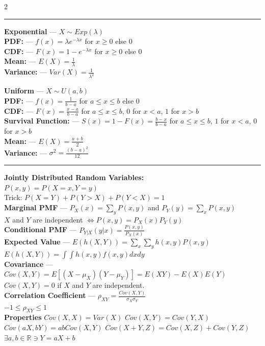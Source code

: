 \documentclass[10pt,letterpaper]{article}
\begin{document}
\begin{multicols}{2}
\vspace{0.1cm}
\hrule
\vspace{0.1cm}

\textbf{Exponential} --- $X \sim Exp(\lambda)$\\
\textbf{PDF:} --- $f(x) = \lambda e^{-\lambda x}$ for $ x \geq 0 $ else $0$\\
\textbf{CDF:} --- $F(x) = 1 - e^{-\lambda x}$ for $ x \geq 0 $ else $0$\\
\textbf{Mean:} --- $E(X) = \frac{1}{\lambda}$\\
\textbf{Variance:} --- $Var(X) = \frac{1}{\lambda^2}$

\vspace{1.5cm}

\textbf{Uniform} --- $X \sim U(a, b)$\\
\textbf{PDF:} --- $f(x) = \frac{1}{b - a}$ for $ a \leq x \leq b $ else $0$\\
\textbf{CDF:} --- $F(x) = \frac{x - a}{b - a}$ for $ a \leq x \leq b $, $0$ for $ x < a $, $1$ for $ x > b $\\
\textbf{Survival Function:} --- $S(x) = 1 - F(x) = \frac{b - x}{b - a}$ for $ a \leq x \leq b $, $1$ for $ x < a $, $0$ for $ x > b $\\
\textbf{Mean:} --- $E(X) = \frac{a + b}{2}$\\
\textbf{Variance:} --- $\sigma^2 = \frac{(b - a)^2}{12}$

\vspace{0.1cm}
\hrule
\vspace{0.1cm}

\textbf{Jointly Distributed Random Variables:}\\
$P(x, y) = P(X = x, Y = y)$\\
Trick: $P(X=Y) + P(Y > X) + P(Y < X) = 1$\\
\textbf{Marginal PMF} --- $P_X(x) = \sum_y P(x, y)$ and $P_Y(y) = \sum_x P(x, y)$\\
$X$ and $Y$ are independent $\iff P(x, y) = P_X(x)P_Y(y)$\\
\textbf{Conditional PMF} --- $P_{Y|X}(y|x) = \frac{P(x, y)}{P_X(x)}$\\
\textbf{Expected Value} --- $E(h(X,Y)) = \sum_x \sum_y h(x,y) P(x,y)$\\
$E(h(X,Y)) = \int \int h(x,y) f(x,y) dx dy$\\
\textbf{Covariance} --- $Cov(X,Y) = E[(X - \mu_X)(Y - \mu_Y)] = E(XY) - E(X)E(Y)$\\
$Cov(X,Y) = 0$ if \( X \) and \( Y \) are independent.\\
\textbf{Correlation Coefficient} --- $\rho_{XY} = \frac{Cov(X,Y)}{\sigma_X \sigma_Y}$\\
$-1 \leq \rho_{XY} \leq 1$\\
\textbf{Properties} $Cov(X,X) = Var(X)$ $Cov(X,Y) = Cov(Y,X)$ $Cov(aX,bY) = abCov(X,Y)$
$Cov(X + Y, Z) = Cov(X,Z) + Cov(Y,Z)$ $\exists a,b \in \mathbb{R} \ni Y = aX + b$


\end{multicols}
\end{document}
